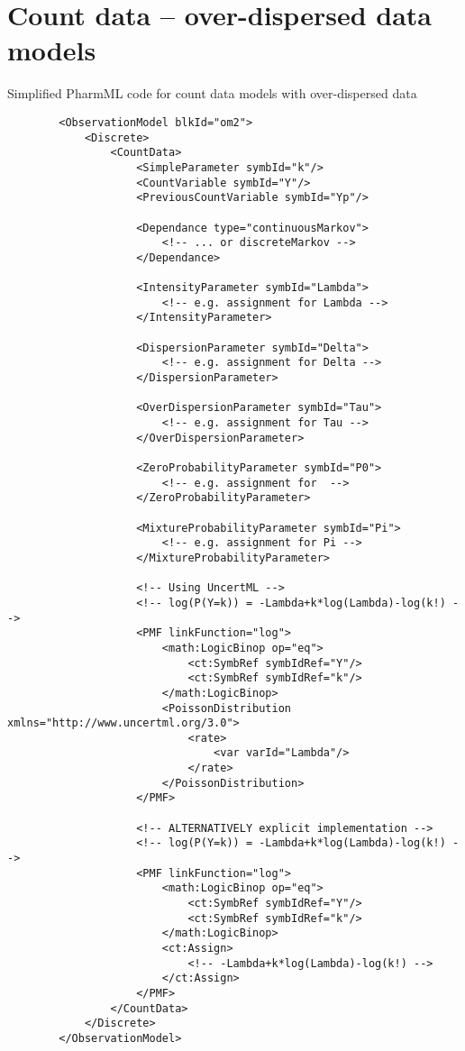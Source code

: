 \section{Count data -- over-dispersed data models}
Simplified PharmML code for count data models with over-dispersed data
\lstset{language=XML}
\begin{lstlisting}
        <ObservationModel blkId="om2">
            <Discrete>
                <CountData>
                    <SimpleParameter symbId="k"/>
                    <CountVariable symbId="Y"/>
                    <PreviousCountVariable symbId="Yp"/>

                    <Dependance type="continuousMarkov">
                        <!-- ... or discreteMarkov -->
                    </Dependance>
                    
                    <IntensityParameter symbId="Lambda">
                        <!-- e.g. assignment for Lambda -->
                    </IntensityParameter>
                    
                    <DispersionParameter symbId="Delta">
                        <!-- e.g. assignment for Delta -->
                    </DispersionParameter>

                    <OverDispersionParameter symbId="Tau">
                        <!-- e.g. assignment for Tau -->
                    </OverDispersionParameter>
                    
                    <ZeroProbabilityParameter symbId="P0">
                        <!-- e.g. assignment for  -->
                    </ZeroProbabilityParameter>
                    
                    <MixtureProbabilityParameter symbId="Pi">
                        <!-- e.g. assignment for Pi -->
                    </MixtureProbabilityParameter>
                    
                    <!-- Using UncertML -->
                    <!-- log(P(Y=k)) = -Lambda+k*log(Lambda)-log(k!) -->
                    <PMF linkFunction="log">
                        <math:LogicBinop op="eq">
                            <ct:SymbRef symbIdRef="Y"/>
                            <ct:SymbRef symbIdRef="k"/>
                        </math:LogicBinop>
                        <PoissonDistribution xmlns="http://www.uncertml.org/3.0">
                            <rate>
                                <var varId="Lambda"/>
                            </rate>
                        </PoissonDistribution>
                    </PMF>
                    
                    <!-- ALTERNATIVELY explicit implementation -->
                    <!-- log(P(Y=k)) = -Lambda+k*log(Lambda)-log(k!) -->
                    <PMF linkFunction="log">
                        <math:LogicBinop op="eq">
                            <ct:SymbRef symbIdRef="Y"/>
                            <ct:SymbRef symbIdRef="k"/>
                        </math:LogicBinop>
                        <ct:Assign>
                            <!-- -Lambda+k*log(Lambda)-log(k!) -->
                        </ct:Assign>
                    </PMF>
                </CountData>
            </Discrete>
        </ObservationModel>
\end{lstlisting}
